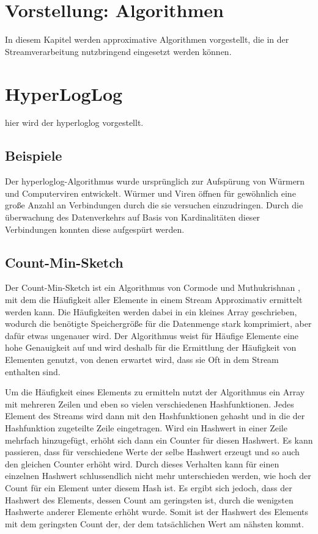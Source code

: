 \section{Vorstellung: Algorithmen}
In diesem Kapitel werden approximative Algorithmen vorgestellt, 
die in der Streamverarbeitung nutzbringend eingesetzt werden können.

\section{HyperLogLog}
hier wird der hyperloglog vorgestellt.
\subsection{Beispiele}
Der hyperloglog-Algorithmus wurde ursprünglich zur Aufspürung von Würmern und Computerviren entwickelt. 
Würmer und Viren öffnen für gewöhnlich eine große Anzahl an Verbindungen durch die sie versuchen einzudringen. 
Durch die überwachung des Datenverkehrs auf Basis von Kardinalitäten dieser Verbindungen konnten diese aufgespürt werden. \cite{flajolet2007}



\subsection{Count-Min-Sketch}
Der Count-Min-Sketch ist ein Algorithmus von Cormode und Muthukrishnan \cite{cormode2003}, 
mit dem die Häufigkeit aller Elemente in einem Stream Approximativ ermittelt werden kann. 
Die Häufigkeiten werden dabei in ein kleines Array geschrieben, 
wodurch die benötigte Speichergröße für die Datenmenge stark komprimiert, 
aber dafür etwas ungenauer wird. 
Der Algorithmus weist für Häufige Elemente eine hohe Genauigkeit auf 
und wird deshalb für die Ermittlung der Häufigkeit von Elementen genutzt, 
von denen erwartet wird, dass sie Oft in dem Stream enthalten sind.

Um die Häufigkeit eines Elements zu ermitteln 
nutzt der Algorithmus ein Array mit mehreren Zeilen 
und eben so vielen verschiedenen Hashfunktionen. 
Jedes Element des Streams wird dann mit den Hashfunktionen gehasht 
und in die der Hashfunktion zugeteilte Zeile eingetragen. 
Wird ein Hashwert in einer Zeile mehrfach hinzugefügt, 
erhöht sich dann ein Counter für diesen Hashwert. 
Es kann passieren, dass für verschiedene Werte der selbe Hashwert erzeugt 
und so auch den gleichen Counter erhöht wird. 
Durch dieses Verhalten kann für einen einzelnen Hashwert 
schlussendlich nicht mehr unterschieden werden, 
wie hoch der Count für ein Element unter diesem Hash ist. 
Es ergibt sich jedoch, dass der Hashwert des Elements, dessen Count am geringsten ist, 
durch die wenigsten Hashwerte anderer Elemente erhöht wurde. 
Somit ist der Hashwert des Elements mit dem geringsten Count der, 
der dem tatsächlichen Wert am nähsten kommt. \cite{cormode2017}

